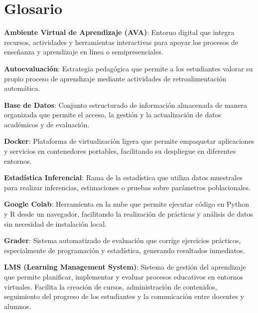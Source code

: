 \documentclass[letter,oneside,12pt,spanish]{report}
\begin{document}
\parskip=12pt
\tableofcontents                    

\newpage

\listoffigures                         %
\newpage
\listoftables
\newpage

\chapter*{Glosario}

\begin{description}

\item \textbf{Ambiente Virtual de Aprendizaje (AVA)}: Entorno digital que integra recursos, actividades y herramientas interactivas para apoyar los procesos de enseñanza y aprendizaje en línea o semipresenciales.
\item \textbf{Autoevaluación}: Estrategia pedagógica que permite a los estudiantes valorar su propio proceso de aprendizaje mediante actividades de retroalimentación automática.
\item \textbf{Base de Datos}: Conjunto estructurado de información almacenada de manera organizada que permite el acceso, la gestión y la actualización de datos académicos y de evaluación.
\item \textbf{Docker}: Plataforma de virtualización ligera que permite empaquetar aplicaciones y servicios en contenedores portables, facilitando su despliegue en diferentes entornos.
\item \textbf{Estadística Inferencial}: Rama de la estadística que utiliza datos muestrales para realizar inferencias, estimaciones o pruebas sobre parámetros poblacionales.
\item \textbf{Google Colab}: Herramienta en la nube que permite ejecutar código en Python y R desde un navegador, facilitando la realización de prácticas y análisis de datos sin necesidad de instalación local.
\item \textbf{Grader}: Sistema automatizado de evaluación que corrige ejercicios prácticos, especialmente de programación y estadística, generando resultados inmediatos.
\item \textbf{LMS (Learning Management System)}: Sistema de gestión del aprendizaje que permite planificar, implementar y evaluar procesos educativos en entornos virtuales. Facilita la creación de cursos, administración de contenidos, seguimiento del progreso de los estudiantes y la comunicación entre docentes y alumnos.

\end{description}
\end{document}
